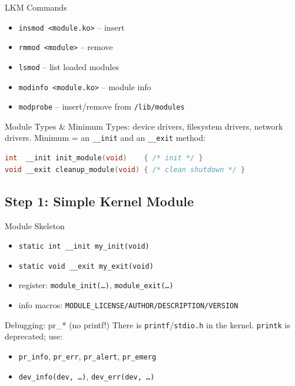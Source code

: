 
\begin{definition}{LKM Commands}
    \begin{itemize}
        \item \texttt{insmod <module.ko>} -- insert
        \item \texttt{rmmod <module>} -- remove
        \item \texttt{lsmod} -- list loaded modules
        \item \texttt{modinfo <module.ko>} -- module info
        \item \texttt{modprobe} -- insert/remove from \texttt{/lib/modules}
    \end{itemize}
\end{definition}

\begin{definition}{Module Types \& Minimum}
    Types: device drivers, filesystem drivers, network drivers. Minimum = an
    \texttt{\_\_init} and an \texttt{\_\_exit} method:
\begin{lstlisting}[language=C, style=basesmol, aboveskip=2pt, belowskip=2pt]
int  __init init_module(void)    { /* init */ }
void __exit cleanup_module(void) { /* clean shutdown */ }
\end{lstlisting}
\end{definition}

\multend

\subsection{Step 1: Simple Kernel Module}


\begin{definition}{Module Skeleton}
    \begin{itemize}
        \item \texttt{static int \_\_init my\_init(void)}
        \item \texttt{static void \_\_exit my\_exit(void)}
        \item register: \texttt{module\_init(\dots)}, \texttt{module\_exit(\dots)}
        \item info macros: \texttt{MODULE\_LICENSE/AUTHOR/DESCRIPTION/VERSION}
    \end{itemize}
\end{definition}

\begin{definition}{Debugging: pr\_* (no printf!)}
    There is  \texttt{printf}/\texttt{stdio.h} in the kernel.
    \texttt{printk} is deprecated; use:
    \begin{itemize}
        \item \texttt{pr\_info}, \texttt{pr\_err}, \texttt{pr\_alert}, \texttt{pr\_emerg}
        \item \texttt{dev\_info(dev, \dots)}, \texttt{dev\_err(dev, \dots)}
    \end{itemize}
\end{definition}


